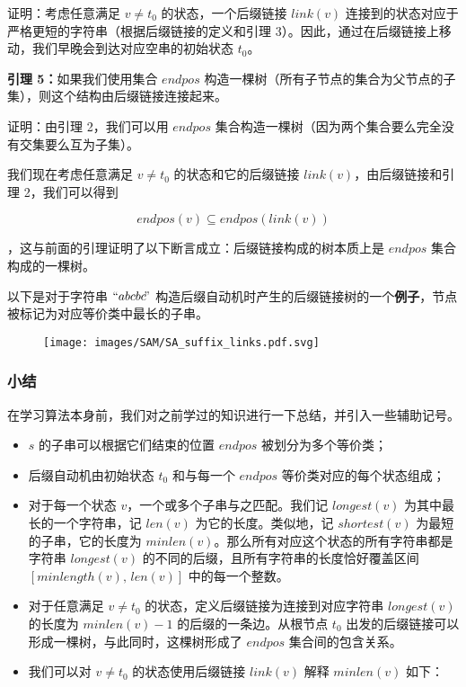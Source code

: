 证明：考虑任意满足 $v\ne t_0$ 的状态，一个后缀链接 $link(v)$ 连接到的状态对应于严格更短的字符串（根据后缀链接的定义和引理 3）。因此，通过在后缀链接上移动，我们早晚会到达对应空串的初始状态 $t_0$。

\begin{QUOTE}{}{}
\textbf{引理 5：}如果我们使用集合 $endpos$ 构造一棵树（所有子节点的集合为父节点的子集），则这个结构由后缀链接连接起来。
\end{QUOTE}

证明：由引理 2，我们可以用 $endpos$ 集合构造一棵树（因为两个集合要么完全没有交集要么互为子集）。

我们现在考虑任意满足 $v\ne t_0$ 的状态和它的后缀链接 $link(v)$，由后缀链接和引理 2，我们可以得到

$$
endpos(v)\subseteq endpos(link(v))
$$

，这与前面的引理证明了以下断言成立：后缀链接构成的树本质上是 $endpos$ 集合构成的一棵树。

以下是对于字符串 $``abcbc\!"$ 构造后缀自动机时产生的后缀链接树的一个\textbf{例子}，节点被标记为对应等价类中最长的子串。

\begin{figure}[h]
\centering
\texttt{[image: images/SAM/SA\_suffix\_links.pdf.svg]} 

\end{figure}

\subsubsection{小结}

在学习算法本身前，我们对之前学过的知识进行一下总结，并引入一些辅助记号。

\begin{itemize}
\item $s$ 的子串可以根据它们结束的位置 $endpos$ 被划分为多个等价类；
\item 后缀自动机由初始状态 $t_0$ 和与每一个 $endpos$ 等价类对应的每个状态组成；
\item 对于每一个状态 $v$，一个或多个子串与之匹配。我们记 $longest(v)$ 为其中最长的一个字符串，记 $len(v)$ 为它的长度。类似地，记 $shortest(v)$ 为最短的子串，它的长度为 $minlen(v)$。那么所有对应这个状态的所有字符串都是字符串 $longest(v)$ 的不同的后缀，且所有字符串的长度恰好覆盖区间 $[minlength(v),\,len(v)]$ 中的每一个整数。
\item 对于任意满足 $v\ne t_0$ 的状态，定义后缀链接为连接到对应字符串 $longest(v)$ 的长度为 $minlen(v)-1$ 的后缀的一条边。从根节点 $t_0$ 出发的后缀链接可以形成一棵树，与此同时，这棵树形成了 $endpos$ 集合间的包含关系。
\item 我们可以对 $v\ne t_0$ 的状态使用后缀链接 $link(v)$ 解释 $minlen(v)$ 如下：
\end{itemize}


